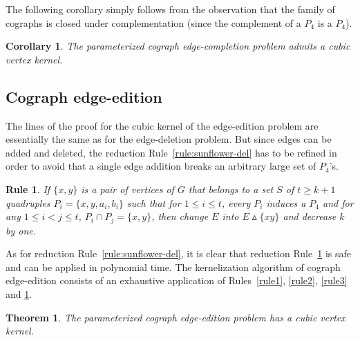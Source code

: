 \documentclass[11pt]{article}
\newtheorem{theorem}[lemma]{Theorem}
\newtheorem{corollary}[lemma]{Corollary}
\newtheorem{reduction}{Rule}
\begin{document}
The following corollary simply follows from the observation that the family of cographs is closed under complementation (since the complement
 of a $P_4$ is a $P_4$).
 
 \begin{corollary}
The parameterized cograph edge-completion problem admits a cubic vertex kernel.
\end{corollary}

\subsection{Cograph edge-edition}

The lines of the proof for the cubic kernel of the edge-edition problem are essentially the same as for the edge-deletion problem. But since edges can be added and deleted, the reduction Rule~\ref{rule:sunflower-del} has to be refined in order to avoid that a single edge addition breaks an arbitrary large set of $P_4$'s.

\begin{reduction} \label{rule:sunflower-edition}
If $\{x,y\}$ is a pair of vertices of $G$ that belongs to a set $S$ of  $t\geqslant k+1$ quadruples $P_i=\{x,y,a_i,b_i\}$ such that for $1\leqslant i\leqslant t$, every $P_i$ induces a $P_4$ and for any $1\leqslant i<j\leqslant t$, $P_i\cap P_j=\{x,y\}$, then change $E$ into $E\vartriangle \{xy\}$ and decrease $k$ by one.
\end{reduction}

As for reduction Rule~\ref{rule:sunflower-del}, it is clear that reduction Rule~\ref{rule:sunflower-edition} is safe and can be applied in polynomial time. The kernelization algorithm of cograph edge-edition consists of an exhaustive application of Rules~\ref{rule1}, \ref{rule2}, \ref{rule3} and \ref{rule:sunflower-edition}.

\begin{theorem}
\label{th:edition}
The parameterized cograph edge-edition problem has a cubic vertex kernel.
\end{theorem}
\end{document}
